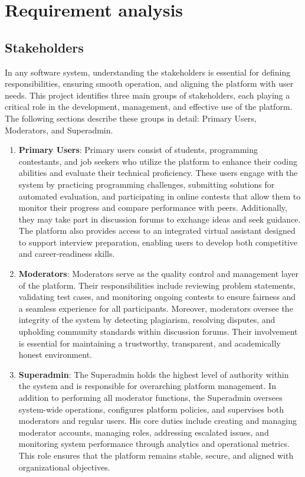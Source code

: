 \section{Requirement analysis}
\subsection{Stakeholders}
In any software system, understanding the stakeholders is essential for defining responsibilities, ensuring smooth operation, and aligning the platform with user needs. This project identifies three main groups of stakeholders, each playing a critical role in the development, management, and effective use of the platform. The following sections describe these groups in detail: Primary Users, Moderators, and Superadmin.
\begin{enumerate}
    \item \textbf{Primary Users}: Primary users consist of students, programming contestants, and job seekers who utilize the platform to enhance their coding abilities and evaluate their technical proficiency. These users engage with the system by practicing programming challenges, submitting solutions for automated evaluation, and participating in online contests that allow them to monitor their progress and compare performance with peers. Additionally, they may take part in discussion forums to exchange ideas and seek guidance. The platform also provides access to an integrated virtual assistant designed to support interview preparation, enabling users to develop both competitive and career-readiness skills.
    \item \textbf{Moderators}: Moderators serve as the quality control and management layer of the platform. Their responsibilities include reviewing problem statements, validating test cases, and monitoring ongoing contests to ensure fairness and a seamless experience for all participants. Moreover, moderators oversee the integrity of the system by detecting plagiarism, resolving disputes, and upholding community standards within discussion forums. Their involvement is essential for maintaining a trustworthy, transparent, and academically honest environment.
    \item \textbf{Superadmin}: The Superadmin holds the highest level of authority within the system and is responsible for overarching platform management. In addition to performing all moderator functions, the Superadmin oversees system-wide operations, configures platform policies, and supervises both moderators and regular users. His core duties include creating and managing moderator accounts, managing roles, addressing escalated issues, and monitoring system performance through analytics and operational metrics. This role ensures that the platform remains stable, secure, and aligned with organizational objectives.
\end{enumerate}

